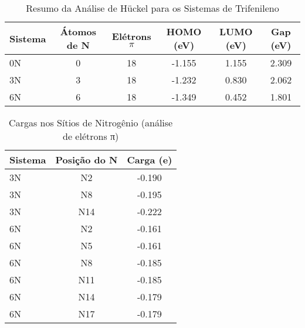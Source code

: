 

\begin{table}[h]
\centering
\caption{Resumo da Análise de Hückel para os Sistemas de Trifenileno}
\begin{tabular}{lccccc}
\hline
Sistema & Átomos de N & Elétrons $\pi$ & HOMO (eV) & LUMO (eV) & Gap (eV) \\
\hline
0N & 0 & 18 & -1.155 & 1.155 & 2.309 \\
3N & 3 & 18 & -1.232 & 0.830 & 2.062 \\
6N & 6 & 18 & -1.349 & 0.452 & 1.801 \\
\hline
\end{tabular}
\end{table}


\begin{table}[h]
\centering
\caption{Cargas nos Sítios de Nitrogênio (análise de elétrons π)}
\begin{tabular}{lcc}
\hline
Sistema & Posição do N & Carga (e) \\
\hline
3N & N2 & -0.190 \\
3N & N8 & -0.195 \\
3N & N14 & -0.222 \\
6N & N2 & -0.161 \\
6N & N5 & -0.161 \\
6N & N8 & -0.185 \\
6N & N11 & -0.185 \\
6N & N14 & -0.179 \\
6N & N17 & -0.179 \\
\hline
\end{tabular}
\end{table}
